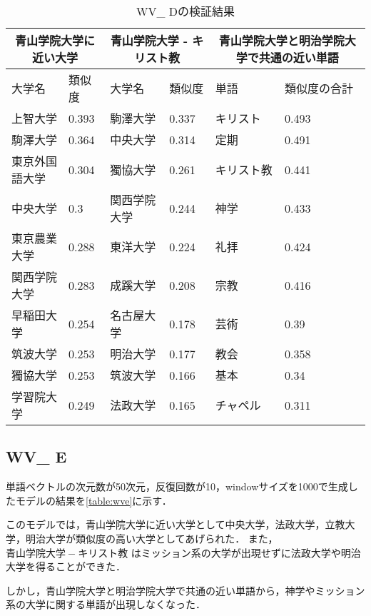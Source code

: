 \begin{table}[H]
\caption{WV\_ Dの検証結果}
\centering
\footnotesize
\begin{tabular}{ll|ll|ll}
\hline
\multicolumn{2}{c}{青山学院大学に近い大学} & \multicolumn{2}{c}{青山学院大学 - キリスト教} & \multicolumn{2}{c}{青山学院大学と明治学院大学で共通の近い単語}
\\ \hline
大学名 & 類似度 & 大学名 & 類似度 & 単語 & 類似度の合計
\\ \hline \hline
上智大学 & 0.393 & 駒澤大学 & 0.337 & キリスト & 0.493\\
駒澤大学 & 0.364 & 中央大学 & 0.314 & 定期 & 0.491\\
東京外国語大学 & 0.304 & 獨協大学 & 0.261 & キリスト教 & 0.441\\
中央大学 & 0.3 & 関西学院大学 & 0.244 & 神学 & 0.433\\
東京農業大学 & 0.288 & 東洋大学 & 0.224 & 礼拝 & 0.424\\
関西学院大学 & 0.283 & 成蹊大学 & 0.208 & 宗教 & 0.416\\
早稲田大学 & 0.254 & 名古屋大学 & 0.178 & 芸術 & 0.39\\
筑波大学 & 0.253 & 明治大学 & 0.177 & 教会 & 0.358\\
獨協大学 & 0.253 & 筑波大学 & 0.166 & 基本 & 0.34\\
学習院大学 & 0.249 & 法政大学 & 0.165 & チャペル & 0.311\\ \hline
\end{tabular}
\label{table:wvd}
\end{table}

\subsection{WV\_ E}
単語ベクトルの次元数が50次元，反復回数が10，windowサイズを1000で生成したモデルの結果を\ref{table:wve}に示す．

このモデルでは，青山学院大学に近い大学として中央大学，法政大学，立教大学，明治大学が類似度の高い大学としてあげられた．
また，$ 青山学院大学 - キリスト教 $ はミッション系の大学が出現せずに法政大学や明治大学を得ることができた．

しかし，青山学院大学と明治学院大学で共通の近い単語から，神学やミッション系の大学に関する単語が出現しなくなった．

